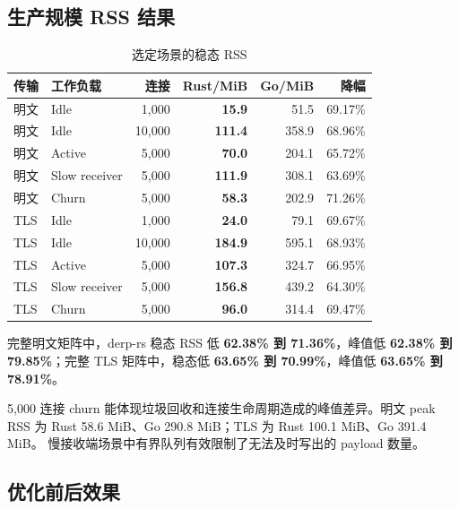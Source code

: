 \documentclass[UTF8,a4paper,zihao=-4]{ctexart}
\newcommand{\metric}[1]{\textcolor{Primary}{\textbf{#1}}}
\begin{document}
\subsection{生产规模 RSS 结果}

\begin{table}[htbp]
\centering
\small
\begin{tabular}{llrrrr}
\toprule
\textbf{传输} & \textbf{工作负载} & \textbf{连接} &
\textbf{Rust/MiB} & \textbf{Go/MiB} & \textbf{降幅} \\
\midrule
明文 & Idle          & 1,000  & \metric{15.9}  & 51.5  & 69.17\% \\
明文 & Idle          & 10,000 & \metric{111.4} & 358.9 & 68.96\% \\
明文 & Active        & 5,000  & \metric{70.0}  & 204.1 & 65.72\% \\
明文 & Slow receiver & 5,000  & \metric{111.9} & 308.1 & 63.69\% \\
明文 & Churn         & 5,000  & \metric{58.3}  & 202.9 & 71.26\% \\
\midrule
TLS & Idle           & 1,000  & \metric{24.0}  & 79.1  & 69.67\% \\
TLS & Idle           & 10,000 & \metric{184.9} & 595.1 & 68.93\% \\
TLS & Active         & 5,000  & \metric{107.3} & 324.7 & 66.95\% \\
TLS & Slow receiver  & 5,000  & \metric{156.8} & 439.2 & 64.30\% \\
TLS & Churn          & 5,000  & \metric{96.0}  & 314.4 & 69.47\% \\
\bottomrule
\end{tabular}
\caption{选定场景的稳态 RSS}
\end{table}

完整明文矩阵中，derp-rs 稳态 RSS 低 \metric{62.38\% 到 71.36\%}，峰值低
\metric{62.38\% 到 79.85\%}；完整 TLS 矩阵中，稳态低
\metric{63.65\% 到 70.99\%}，峰值低 \metric{63.65\% 到 78.91\%}。

5,000 连接 churn 能体现垃圾回收和连接生命周期造成的峰值差异。明文 peak RSS
为 Rust 58.6 MiB、Go 290.8 MiB；TLS 为 Rust 100.1 MiB、Go 391.4 MiB。
慢接收端场景中有界队列有效限制了无法及时写出的 payload 数量。

\subsection{优化前后效果}
\end{document}
